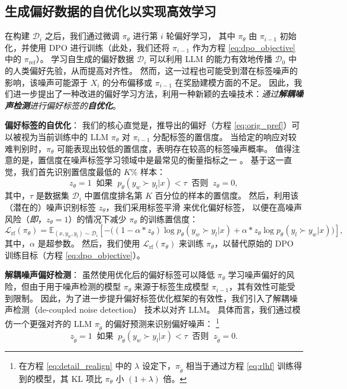 \subsection{生成偏好数据的自优化以实现高效学习} \label{sec:method:self_refine}  
在构建 $\mathcal{D}_i$ 之后，我们通过微调 $\pi_{\theta}$ 进行第 $i$ 轮偏好学习，
其中 $\pi_{\theta}$ 由 $\pi_{i-1}$ 初始化，并使用 DPO 进行训练（此处，我们还将 $\pi_{i-1}$ 作为方程 \ref{eq:dpo_objective} 中的 $\pi_{\text{ref}}$）。  
学习自生成的偏好数据 $\mathcal{D}_i$ 可以利用 LLM 的能力有效地传播 $\mathcal{D}_0$ 中的人类偏好先验，从而提高对齐性。  
然而，这一过程也可能受到潜在标签噪声的影响，该噪声可能源于 $X_i$ 的分布偏移或 $\pi_{i-1}$ 在奖励建模方面的不足。  
因此，我们进一步提出了一种改进的偏好学习方法，利用一种新颖的去噪技术：\textit{通过\textbf{解耦噪声检测}进行偏好标签的\textbf{自优化}}。  

\textbf{偏好标签的自优化}：  
我们的核心直觉是，推导出的偏好（方程 \ref{eq:orig_pref}）可以被视为当前训练中的 LLM $\pi_{\theta}$ 对 $\pi_{i-1}$ 分配标签的置信度。  
当给定的响应对较难判别时，$\pi_{\theta}$ 可能表现出较低的置信度，表明存在较高的标签噪声概率。  
值得注意的是，置信度在噪声标签学习领域中是最常见的衡量指标之一 \citep{han2018co, reed2014training, sohn2020fixmatch}。  
基于这一直觉，我们首先识别置信度最低的 $K$\% 样本：
\begin{equation}\label{eq:naive_noise_detection}
    z_{\theta}=1~ 
    \text{ 如果 }~p_{\theta}(y_{w} \succ y_{l} | x)<\tau~\text{ 否则 }~z_{\theta}=0,
\end{equation}
其中，$\tau$ 是数据集 $\mathcal{D}_i$ 中置信度排名第 $K$ 百分位的样本的置信度。  
然后，利用该（潜在的）噪声识别标签 $z_\theta$，我们采用标签平滑 \citep{muller2019does} 来优化偏好标签，
以便在高噪声风险（\textit{即}，$z_{\theta}=1$）的情况下减少 $\pi_{\theta}$ 的训练置信度：
\begin{equation} \label{eq:self_refine_combined}
    \mathcal{L}_\text{rf}(\pi_{\theta}) = \mathbb{E}_{(x, y_w, y_l) \sim \mathcal{D}_i} \left[-\big((1-\alpha \ast z_{\theta}) \log p_{\theta}(y_{w} \succ y_{l} | x) + \alpha \ast z_{\theta} \log p_{\theta}(y_{l} \succ y_{w} | x) \big)\right], 
\end{equation}
其中，$\alpha$ 是超参数。  
然后，我们使用 $\mathcal{L}_\text{rf}(\pi_{\theta})$ 来训练 $\pi_{\theta}$，以替代原始的 DPO 训练目标（方程 \ref{eq:dpo_objective}）。  

\textbf{解耦噪声偏好检测}：  
虽然使用优化后的偏好标签可以降低 $\pi_{\theta}$ 学习噪声偏好的风险，但由于用于噪声检测的模型 $\pi_{\theta}$ 来源于标签生成模型 $\pi_{i-1}$，其有效性可能受到限制。  
因此，为了进一步提升偏好标签优化框架的有效性，我们引入了解耦噪声检测（de-coupled noise detection）\citep{han2018co, li2020dividemix} 技术以对齐 LLM。  
具体而言，我们通过模仿一个更强对齐的 LLM $\pi_{\widetilde{\theta}}$ 的偏好预测来识别偏好噪声：
\footnote{在方程 \ref{eq:detail_realign} 中的 $\lambda$ 设定下，$\pi_{\widetilde{\theta}}$ 相当于通过方程 \ref{eq:rlhf} 训练得到的模型，其 KL 项比 $\pi_{\theta}$ 小 $(1 + \lambda)$ 倍。}
\begin{equation}\label{eq:noise_realign}
    z_{\widetilde{\theta}}=1~ 
    \text{ 如果 }~p_{\widetilde{\theta}}(y_{w} \succ y_{l} | x)<\tau~\text{ 否则 }~z_{\widetilde{\theta}}=0.
\end{equation}

